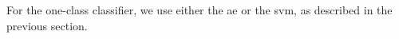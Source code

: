 \documentclass[draftcls,onecolumn,12pt]{IEEEtran}
\begin{document}
{For the one-class classifier, we use either the \ac{ae} or the \ac{svm}, as described in the previous section. 
%
%
%
% 
%
%    


}
\end{document}
